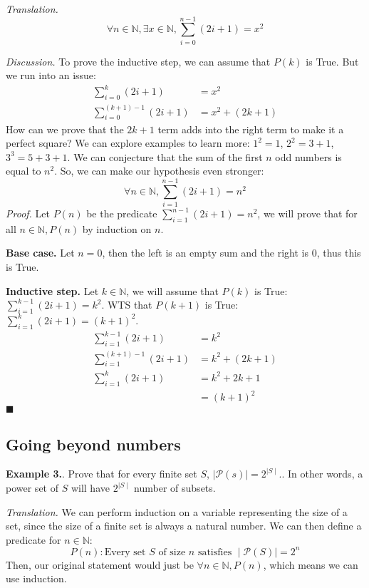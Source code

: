 \documentclass{article}
\newcounter{excount}
\newcommand\ex{\stepcounter{excount} \textbf{Example 3.\theexcount}. }
\newcommand\qedsymbol{\hfill$\blacksquare$}
\begin{document}
\textit{Translation.} $$\forall n \in \mathbb{N}, \exists x \in \mathbb{N}
, \sum_{i = 0}^{n - 1} (2i + 1) = x^2
$$

\textit{Discussion.} To prove the inductive step, we can assume that $P(k)$ 
is True. But we run into an issue:
\begin{align*}
    \sum_{i=0}^{k} (2i + 1) &= x^2 \\
    \sum_{i=0}^{(k+1)-1} (2i+1) &= x^2 + (2k + 1) 
\end{align*}
How can we prove that the $2k + 1$ term adds into the right term to make it
a perfect square? We can explore examples to learn more: $1^2 = 1$, $2^2 = 
3 + 1$, $3^3 = 5 + 3 + 1$. We can conjecture that the sum of the first $n$ 
odd numbers is equal to $n^2$. So, we can make our hypothesis even stronger: 
$$\forall n \in \mathbb{N}, \sum_{i=1}^{n-1} (2i + 1) = n^2$$
\textit{Proof.} Let $P(n)$ be the predicate $\sum_{i=1}^{n-1} (2i + 1) = n^2$, 
we will prove that for all $n \in \mathbb{N}, P(n)$ by induction on $n$.

\textbf{Base case.} Let $n = 0 $, then the left is an empty sum and the right 
is 0, thus this is True.

\textbf{Inductive step.} Let $k \in \mathbb{N}$, we will assume that $P(k)$ 
is True: \linebreak $\sum_{i=1}^{k-1} (2i + 1) = k^2$. WTS that $P(k+1)$ is True: 
$\sum_{i=1}^{k} (2i + 1) = (k+1)^2$.
\begin{align*}
    \sum_{i=1}^{k-1} (2i + 1) &= k^2 \\ 
    \sum_{i=1}^{(k+1)-1} (2i + 1) &= k^2 + (2k + 1)\\ 
    \sum_{i=1}^{k} (2i + 1) &= k^2 + 2k + 1 \\
                            &= (k+1)^2
\end{align*}
\qedsymbol
\subsection{Going beyond numbers}
\ex Prove that for every finite set $S$, $\mid \mathcal{P}(s)\mid = 2^{\mid S \mid }
$.. In other words, a power set of $S$ will have $2^{\mid S \mid} $
number of subsets.

\textit{Translation.} We can perform induction on a variable representing 
the size of a set, since the size of a finite set is always a natural number. 
We can then define a predicate for $n \in \mathbb{N}$:
$$P(n) : \text{Every set $S$ of size $n$ satisfies }\mid \mathcal{P}(S)\mid 
= 2^n$$
Then, our original statement would just be $\forall n \in \mathbb{N}, 
P(n)$, which means we can use induction.
\end{document}
